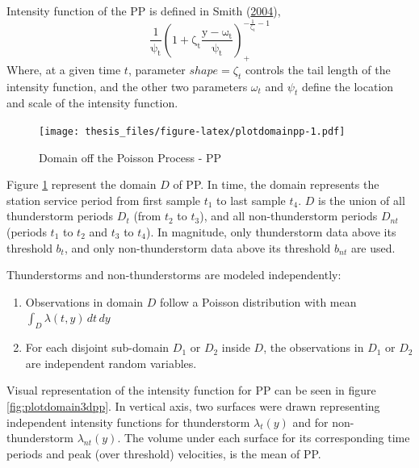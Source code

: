 \documentclass[12pt,oneside]{reedthesis}
\providecommand{\tightlist}{%
  \setlength{\itemsep}{0pt}\setlength{\parskip}{0pt}}
\begin{document}
Intensity function of the PP is defined in Smith (\protect\hyperlink{ref-Smith2004}{2004}),
\begin{equation}
  \mathrm{
    \frac{1}{\psi_t}\left(1+\zeta_t\frac{y-\omega_t}{\psi_t}\right)_+^{-\frac{1}{\zeta_t}-1}
  }
  \label{eq:ppintensityfunction}
\end{equation}
Where, at a given time \(t\), parameter \(shape = \zeta_t\) controls the tail length of the intensity function, and the other two parameters \(\omega_t\) and \(\psi_t\) define the location and scale of the intensity function.

\footnotesize
\begin{figure}
\centering
\texttt{[image: thesis\_files/figure-latex/plotdomainpp-1.pdf]}
\caption{\label{fig:plotdomainpp}Domain off the Poisson Process - PP}
\end{figure}
\normalsize

Figure \ref{fig:plotdomainpp} represent the domain \(D\) of PP. In time, the domain represents the station service period from first sample \(t_1\) to last sample \(t_4\). \(D\) is the union of all thunderstorm periods \(D_t\) (from \(t_2\) to \(t_3\)), and all non-thunderstorm periods \(D_{nt}\) (periods \(t_1\) to \(t_2\) and \(t_3\) to \(t_4\)). In magnitude, only thunderstorm data above its threshold \(b_t\), and only non-thunderstorm data above its threshold \(b_{nt}\) are used.

Thunderstorms and non-thunderstorms are modeled independently:
\begin{enumerate}
\def\labelenumi{\arabic{enumi}.}
\tightlist
\item
  Observations in domain \(D\) follow a Poisson distribution with mean \(\int_D\lambda(t,y)\,dt\,dy\)
\item
  For each disjoint sub-domain \(D_1\) or \(D_2\) inside \(D\), the observations in \(D_1\) or \(D_2\) are independent random variables.
\end{enumerate}
Visual representation of the intensity function for PP can be seen in figure \ref{fig:plotdomain3dpp}. In vertical axis, two surfaces were drawn representing independent intensity functions for thunderstorm \(\lambda_t(y)\) and for non-thunderstorm \(\lambda_{nt}(y)\). The volume under each surface for its corresponding time periods and peak (over threshold) velocities, is the mean of PP.
\end{document}
